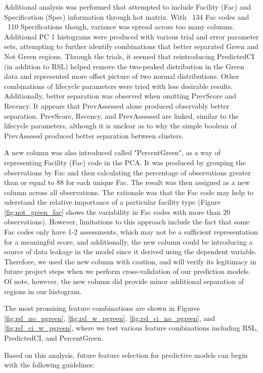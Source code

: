 \documentclass[NewProceedings,letterpaper,NoPageNumbers,NoLineNumbers, DoubleSpace]{ascelike-new}
\begin{document}
Additional analysis was performed that attempted to include Facility (Fac) and Specification (Spec) information through hot matrix. With ~134 Fac codes and ~110 Specifications though, variance was spread across too many columns. Additional PC 1 histograms were produced with various trial and error parameter sets, attempting to further identify combinations that better separated Green and Not Green regions. Through the trials, it seemed that reintroducing PredictedCI (in addition to RSL) helped remove the two-peaked distribution in the Green data and represented more offset picture of two normal distributions. Other combinations of lifecycle parameters were tried with less desirable results. Additionally, better separation was observed when omitting PrevScore and Recency. It appears that PrevAssessed alone produced observably better separation. PrevScore, Recency, and PrevAssessed are linked, similar to the lifecycle parameters, although it is unclear as to why the simple boolean of PrevAssesed produced better separation between clusters.

A new column was also introduced called "PercentGreen", as a way of representing Facility (Fac) code in the PCA.  It was produced by grouping the observations by Fac and then calculating the percentage of observations greater than or equal to 88 for each unique Fac. The result was then assigned as a new column across all observations. The rationale was that the Fac code may help to uderstand the relative importance of a particular facility type (Figure \ref{fig:not_green_fac} shows the variability in Fac codes with more than 20 observations). However, limitations to this approach include the fact that some Fac codes only have 1-2 assessments, which may not be a sufficient representation for a meaningful score, and additionally, the new column could be introducing a source of data leakage in the model since it derived using the dependent variable. Therefore, we used the new column with caution, and will verify its legitimacy in future project steps when we perform cross-validation of our prediction models. Of note, however, the new column did provide minor additional separation of regions in our histogram.

The most promising feature combinations are shown in Figures \ref{fig:rsl_no_pgreen}, \ref{fig:rsl_w_pgreen}, \ref{fig:rsl_ci_no_pgreen}, and \ref{fig:rsl_ci_w_pgreen}, where we test various feature combinations including RSL, PredictedCI, and PercentGreen.

Based on this analysis, future feature selection for predictive models can begin with the following guidelines:
\end{document}
